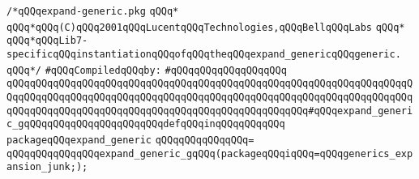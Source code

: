 \label{src/lib/compiler/front/semantic/modules/expand-generic.pkg}
\verb|/*qQQqexpand-generic.pkg|\newline
\verb|qQQq*|\newline
\verb|qQQq*qQQq(C)qQQq2001qQQqLucentqQQqTechnologies,qQQqBellqQQqLabs|\newline
\verb|qQQq*|\newline
\verb|qQQq*qQQqLib7-specificqQQqinstantiationqQQqofqQQqtheqQQqexpand_genericqQQqgeneric.|\newline
\verb|qQQq*/|\newline
\newline
\verb|#qQQqCompiledqQQqby:|\newline
\verb|#qQQqqQQqqQQqqQQqqQQq|\newline
\newline
\verb|qQQqqQQqqQQqqQQqqQQqqQQqqQQqqQQqqQQqqQQqqQQqqQQqqQQqqQQqqQQqqQQqqQQqqQQqqQQqqQQqqQQqqQQqqQQqqQQqqQQqqQQqqQQqqQQqqQQqqQQqqQQqqQQqqQQqqQQqqQQqqQQqqQQqqQQqqQQqqQQqqQQqqQQqqQQqqQQqqQQqqQQqqQQqqQQq#qQQqexpand_generic_gqQQqqQQqqQQqqQQqqQQqqQQqdefqQQqinqQQqqQQqqQQq|\newline
\newline
\verb|packageqQQqexpand_generic|\newline
\verb|qQQqqQQqqQQqqQQq=|\newline
\verb|qQQqqQQqqQQqqQQqexpand_generic_gqQQq(packageqQQqiqQQq=qQQqgenerics_expansion_junk;);|\newline

